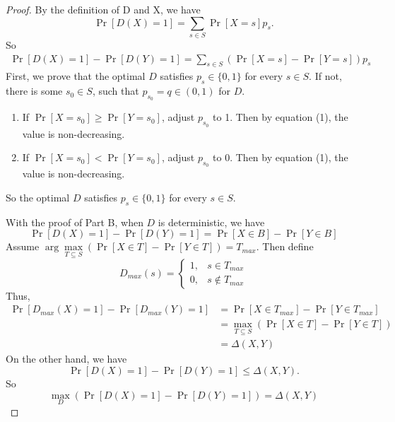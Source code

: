 \documentclass[12pt]{article}
\newenvironment{problem}[2][Problem]{\begin{trivlist}
\item[\hskip \labelsep {\bfseries #1}\hskip \labelsep {\bfseries #2.}]}{\end{trivlist}}
\begin{document}
\begin{problem}{1.Part C}
\begin{proof}
By the definition of D and X, we have
$$\Pr[D(X)=1]=\sum\limits_{s\in S}\Pr[X=s]p_s. $$
So
\begin{eqnarray}
\Pr[D(X)=1]-\Pr[D(Y)=1]=\sum\limits_{s\in S}(\Pr[X=s]-\Pr[Y=s])p_s 
\end{eqnarray}
First, we prove that the optimal $D$ satisfies $p_s\in \{0,1\}$ for every $s\in S$. If not, there is some $s_0\in S$, such that $p_{s_0}=q\in (0,1)$ for $D$. 
\begin{enumerate}
\item If $\Pr[X=s_0]\ge \Pr[Y=s_0]$, adjust $p_{s_0}$ to 1. Then by equation (1), the value is non-decreasing.
\item If $\Pr[X=s_0]<\Pr[Y=s_0]$, adjust $p_{s_0}$ to 0. Then by equation (1), the value is non-decreasing.
\end{enumerate}
So the optimal $D$ satisfies $p_s\in \{0,1\}$ for every $s\in S$. 

With the proof of Part B, when $D$ is deterministic, we have
$$ \Pr[D(X)=1]-\Pr[D(Y)=1]=\Pr[X\in B]-\Pr[Y\in B] $$
Assume $\arg\max\limits_{T\subseteq S}(\Pr[X\in T]-\Pr[Y\in T])=T_{max}$. Then define
\begin{equation*}  
			D_{max}(s)= \begin{cases}
					1, & s\in T_{max} \\  
					0, & s\not\in T_{max}  
				\end{cases} 
		\end{equation*}
Thus, 
\begin{align*}
\Pr[D_{max}(X)=1]-\Pr[D_{max}(Y)=1]&=\Pr[X\in T_{max}]-\Pr[Y\in T_{max}]\\
&=\max\limits_{T\subseteq S}(\Pr[X\in T]-\Pr[Y\in T])\\
&=\Delta(X,Y)   
\end{align*}
On the other hand, we have
$$\Pr[D(X)=1]-\Pr[D(Y)=1]\le \Delta(X,Y).$$
So
$$\max_{D}(\Pr[D(X)=1]-\Pr[D(Y)=1])=\Delta(X,Y)$$


\end{proof}
\end{problem}
\end{document}

